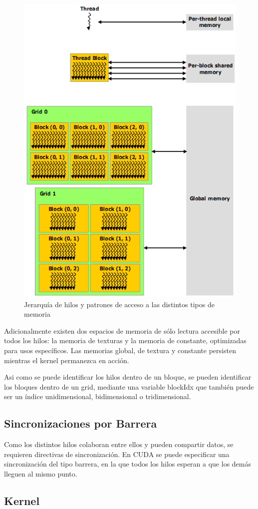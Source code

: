 \documentclass[twocolumn,twoside]{Jornadas}
\begin{document}
\begin{figure}
   \begin{center}
      \includegraphics[width=.5\textwidth]{MemoriaHierarchy.png}
      \caption{\label{fig:MemoriaHierarchy} Jerarquía de hilos y patrones de acceso a las distintos tipos de memoria}
   \end{center}
\end{figure}

Adicionalmente existen dos espacios de memoria de sólo lectura accesible por todos los hilos: la memoria de texturas y la memoria de constante, optimizadas para usos específicos. Las memorias global, de textura y constante persisten mientras el kernel permanezca en acción.

Asi como se puede identificar los hilos dentro de un bloque, se pueden identificar los bloques dentro de un grid, mediante una variable blockIdx que también puede ser un índice unidimensional, bidimensional o tridimensional.

\subsection{Sincronizaciones por Barrera}

Como los distintos hilos colaboran entre ellos y pueden compartir datos, se requieren directivas de sincronización. En CUDA se puede especificar una sincronización del tipo barrera, en la que todos los hilos esperan a que los demás lleguen al mismo punto.

\subsection{Kernel}
\end{document}
